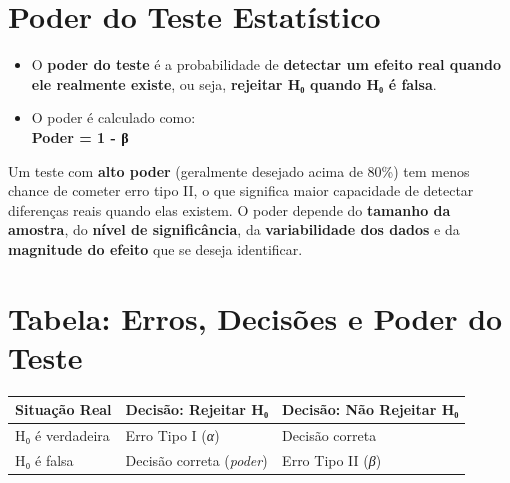\documentclass[
]{book}
\newcounter{none} %
\providecommand{\tightlist}{%
  \setlength{\itemsep}{0pt}\setlength{\parskip}{0pt}}
\begin{document}
\section{Poder do Teste Estatístico}\label{poder-do-teste-estatuxedstico}

\begin{itemize}
\tightlist
\item
  O \textbf{poder do teste} é a probabilidade de \textbf{detectar um efeito real quando ele realmente existe}, ou seja, \textbf{rejeitar H₀ quando H₀ é falsa}.\\
\item
  O poder é calculado como:\\
  \textbf{Poder = 1 - β}
\end{itemize}

Um teste com \textbf{alto poder} (geralmente desejado acima de 80\%) tem menos chance de cometer erro tipo II, o que significa maior capacidade de detectar diferenças reais quando elas existem. O poder depende do \textbf{tamanho da amostra}, do \textbf{nível de significância}, da \textbf{variabilidade dos dados} e da \textbf{magnitude do efeito} que se deseja identificar.

\section{Tabela: Erros, Decisões e Poder do Teste}\label{tabela-erros-decisuxf5es-e-poder-do-teste}

{\def\LTcaptype{none} %
\begin{longtable}[]{@{}
  >{\centering\arraybackslash}p{}
  >{\centering\arraybackslash}p{}
  >{\centering\arraybackslash}p{}@{}}
\toprule\noalign{}
\begin{minipage}[b]{\linewidth}\centering
Situação Real
\end{minipage} & \begin{minipage}[b]{\linewidth}\centering
Decisão: Rejeitar H₀
\end{minipage} & \begin{minipage}[b]{\linewidth}\centering
Decisão: Não Rejeitar H₀
\end{minipage} \\
\midrule\noalign{}
\endhead
\bottomrule\noalign{}
\endlastfoot
H₀ é verdadeira & Erro Tipo I (\emph{α}) & Decisão correta \\
H₀ é falsa & Decisão correta (\emph{poder}) & Erro Tipo II (\emph{β}) \\
\end{longtable}
}
\end{document}
